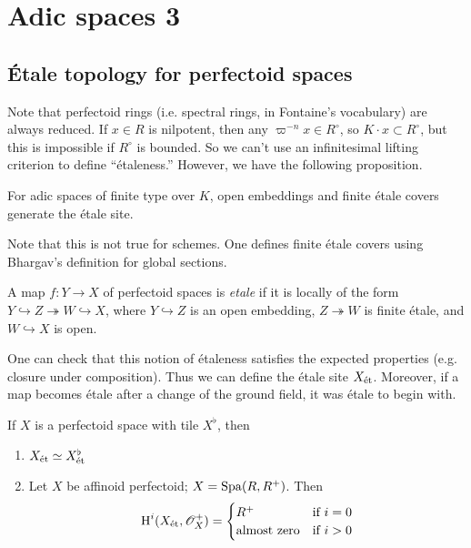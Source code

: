 
\section{Adic spaces 3}


\subsection{\'Etale topology for perfectoid spaces}

Note that perfectoid rings (i.e. spectral rings, in Fontaine's vocabulary) are always 
reduced. If $x\in R$ is nilpotent, then any $\varpi^{-n} x\in R^\circ$, so 
$K\cdot x\subset R^\circ$, but this is impossible if $R^\circ$ is bounded. So we 
can't use an infinitesimal lifting criterion to define ``\'etaleness.'' However, 
we have the following proposition. 

\begin{proposition}
For adic spaces of finite type over $K$, open embeddings and finite \'etale covers 
generate the \'etale site. 
\end{proposition}

Note that this is not true for schemes. One defines finite \'etale covers using 
Bhargav's definition for global sections. 

\begin{definition}
A map $f:Y\to X$ of perfectoid spaces is \emph{etale} if it is locally of the form 
$Y\hookrightarrow Z\twoheadrightarrow W\hookrightarrow X$, where 
$Y\hookrightarrow Z$ is an open embedding, $Z\twoheadrightarrow W$ is finite \'etale, 
and $W\hookrightarrow X$ is open. 
\end{definition}

One can check that this notion of \'etaleness satisfies the expected properties (e.g. 
closure under composition). Thus we can define the \'etale site $X_{\textnormal{\'et}}$. Moreover, 
if a map becomes \'etale after a change of the ground field, it was \'etale to 
begin with. 

\begin{proposition}
If $X$ is a perfectoid space with tile $X^\flat$, then 
\begin{enumerate}
  \item $X_{\textnormal{\'et}}\simeq X_{\textnormal{\'et}}^\flat$
  \item Let $X$ be affinoid perfectoid; $X=\operatorname{Spa}(R,R^+)$. Then 
    \[
      \operatorname{H}^i(X_{\textnormal{\'et}},\mathscr{O}_X^+) = \begin{cases} R^+ & \text{if $i=0$} \\ \text{almost zero} & \text{if $i>0$} \end{cases}
    \]
\end{enumerate}
\end{proposition}

